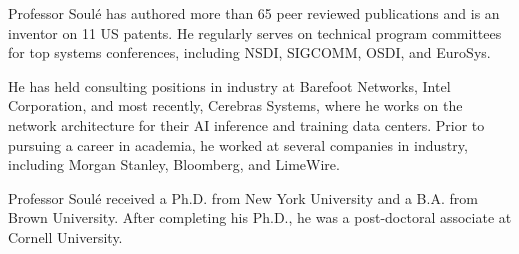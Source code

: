 \documentclass[11pt]{article}
\begin{document}
Professor Soul\'{e} has authored more than 65 peer reviewed publications and is
an inventor on 11 US patents. He regularly serves on technical program committees for top systems
conferences, including NSDI, SIGCOMM, OSDI, and EuroSys.

He has held consulting positions in industry at Barefoot Networks,
Intel Corporation, and most recently, Cerebras Systems, where he works
on the network architecture for their AI inference and training data
centers.  Prior to pursuing a career in academia, he worked at several
companies in industry, including Morgan Stanley, Bloomberg, and
LimeWire.

Professor Soul\'{e} received a Ph.D. from New York University and a
B.A. from Brown University. After completing his Ph.D., he was a
post-doctoral associate at Cornell University.
\end{document}
